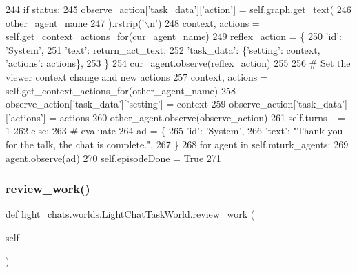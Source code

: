 \begin{DoxyCode}
244                     \textcolor{keywordflow}{if} status:
245                         observe\_action[\textcolor{stringliteral}{'task\_data'}][\textcolor{stringliteral}{'action'}] = self.graph.get\_text(
246                             other\_agent\_name
247                         ).rstrip(\textcolor{stringliteral}{'\(\backslash\)n'})
248                     context, actions = self.get\_context\_actions\_for(cur\_agent\_name)
249                     reflex\_action = \{
250                         \textcolor{stringliteral}{'id'}: \textcolor{stringliteral}{'System'},
251                         \textcolor{stringliteral}{'text'}: return\_act\_text,
252                         \textcolor{stringliteral}{'task\_data'}: \{\textcolor{stringliteral}{'setting'}: context, \textcolor{stringliteral}{'actions'}: actions\},
253                     \}
254                     cur\_agent.observe(reflex\_action)
255 
256                     \textcolor{comment}{# Set the viewer context change and new actions}
257                     context, actions = self.get\_context\_actions\_for(other\_agent\_name)
258                     observe\_action[\textcolor{stringliteral}{'task\_data'}][\textcolor{stringliteral}{'setting'}] = context
259                     observe\_action[\textcolor{stringliteral}{'task\_data'}][\textcolor{stringliteral}{'actions'}] = actions
260                 other\_agent.observe(observe\_action)
261             self.turns += 1
262         \textcolor{keywordflow}{else}:
263             \textcolor{comment}{# evaluate}
264             ad = \{
265                 \textcolor{stringliteral}{'id'}: \textcolor{stringliteral}{'System'},
266                 \textcolor{stringliteral}{'text'}: \textcolor{stringliteral}{"Thank you for the talk, the chat is complete."},
267             \}
268             \textcolor{keywordflow}{for} agent \textcolor{keywordflow}{in} self.mturk\_agents:
269                 agent.observe(ad)
270             self.episodeDone = \textcolor{keyword}{True}
271 
\end{DoxyCode}
\mbox{\label{classlight__chats_1_1worlds_1_1LightChatTaskWorld_aad1cde9025f1234e4e1ecaa463ecbfdd}} 
\subsubsection{\texorpdfstring{review\+\_\+work()}{review\_work()}}
{\footnotesize\ttfamily def light\+\_\+chats.\+worlds.\+Light\+Chat\+Task\+World.\+review\+\_\+work (\begin{DoxyParamCaption}\item[{}]{self }\end{DoxyParamCaption})}



